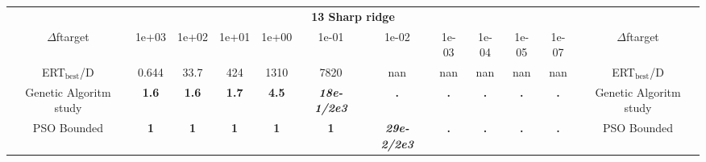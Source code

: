 \begin{tabular}{cccccccccccc}
 & \multicolumn{10}{c}{{\normalsize \textbf{13 Sharp ridge}}}\\
$\Delta$ftarget& 1e+03& 1e+02& 1e+01& 1e+00& 1e-01& 1e-02& 1e-03& 1e-04& 1e-05& 1e-07 & $\Delta$ftarget \\
ERT$_{\textrm{best}}$/D& 0.644& 33.7& 424& 1310& 7820& nan& nan& nan& nan& nan & ERT$_{\textrm{best}}$/D \\
\hline
Genetic Algoritm study & \textbf{1.6} & \textbf{1.6} & \textbf{1.7} & \textbf{4.5} & \textbf{\textit{18e-1}\textit{/2e3}} & \textbf{.} & \textbf{.} & \textbf{.} & \textbf{.} & \textbf{.} & Genetic Algoritm study \cite{add_an_entry_for_Genetic Algoritm study_in_bbob.bib}\\
PSO Bounded & \textbf{1} & \textbf{1} & \textbf{1} & \textbf{1} & \textbf{1} & \textbf{\textit{29e-2}\textit{/2e3}} & \textbf{.} & \textbf{.} & \textbf{.} & \textbf{.} & PSO Bounded \cite{add_an_entry_for_PSO Bounded_in_bbob.bib}
\end{tabular}
